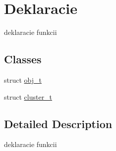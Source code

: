 \hypertarget{group___deklaracie}{}\section{Deklaracie}
\label{group___deklaracie}


deklaracie funkcii  


\subsection*{Classes}
\begin{DoxyCompactItemize}
\item 
struct \hyperlink{structobj__t}{obj\+\_\+t}
\item 
struct \hyperlink{structcluster__t}{cluster\+\_\+t}
\end{DoxyCompactItemize}


\subsection{Detailed Description}
deklaracie funkcii 

